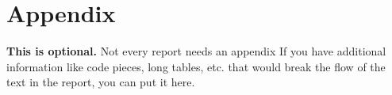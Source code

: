 \chapter{Appendix}
\textbf{This is optional.} Not every report needs an appendix
If you have additional information like code pieces, long tables, etc. that would break the flow  of the text in the report, you can put it here.
% 
